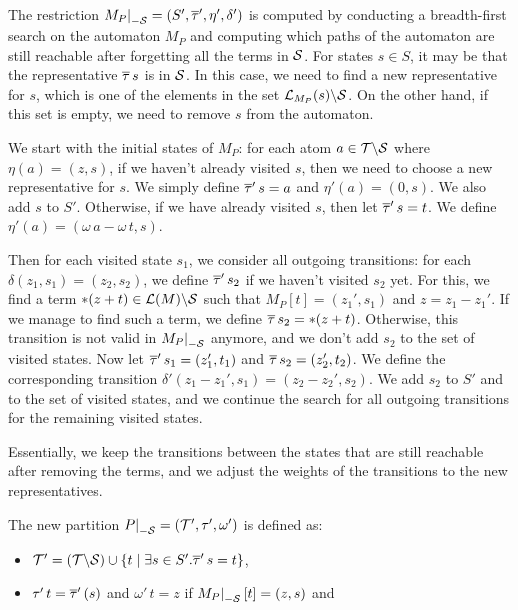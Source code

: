 The restriction $\restr{M_P}{-\Set} = (S', \otau', \eta', \delta')$ is computed by conducting a breadth-first search on the automaton $M_P$
and computing which paths of the automaton are still reachable after forgetting all the terms in $\mathcal{S}$.
For states $s \in S$, it may be that the representative $\overline{\tau}\,s$ is in $\mathcal{S}$.
In this case, we need to find a new representative for $s$, which is one of the elements in the set
$\mathcal{L}_{M_P}(s) \backslash \mathcal{S}$. On the other hand, if this set is empty,
we need to remove $s$ from the automaton.

We start with the initial states of $M_P$:
for each atom $a \in \mathcal{T} \backslash \mathcal{S}$ where $\eta(a) = (z, s)$, if we haven't already visited $s$, then we need to choose a new representative for $s$. We simply define $\overline{\tau}'\,s = a$ and $\eta'(a) = (0, s)$.
We also add $s$ to $S'$.
Otherwise, if we have already visited $s$, then let $\overline{\tau}'\,s = t$. We define $\eta'(a) = (\omega\,a - \omega\,t, s)$.

Then for each visited state $s_1$, we consider all outgoing transitions: for each $\delta(z_1, s_1) = (z_2, s_2)$,
we define $\overline{\tau}'\,s_2$ if we haven't visited $s_2$ yet.
For this, we find a term $*(z+t)\in \mathcal{L}(M)\backslash \mathcal{S}$ such that $M_P[t] = (z_1', s_1)$ and $z = z_1 - z_1'$.
If we manage to find such a term, we define $\overline{\tau}\,s_2 = *(z+t)$.
Otherwise, this transition is not valid in $\restr{M_P}{-\Set}$ anymore, and we don't add $s_2$ to the set of visited states.
Now let $\overline{\tau}'\,s_1 = (z_1', t_1)$ and $\overline{\tau}\,s_2 = (z_2', t_2)$.
We define the corresponding transition $\delta'(z_1 - z_1', s_1) = (z_2 - z_2', s_2)$.
We add $s_2$ to $S'$ and to the set of visited states, and we continue the search for all outgoing transitions for the remaining visited states.

Essentially, we keep the transitions between the states that are still reachable after removing the terms, and we adjust the weights of the transitions to the new representatives.

The new partition $\restr{P}{-\Set} = (\T', \tau', \omega')$ is defined as:
\begin{itemize}
    \item $\mathcal{T}' = (\mathcal{T} \backslash \mathcal{S}) \cup \{t \mid \exists s \in S' . \overline{\tau}'\,s = t\}$,
    \item $\tau'\,t = \overline{\tau}'\,(s)$ and $\omega'\,t = z$ if $\restr{M_P}{-\Set}[t] = (z,s)$ and
\end{itemize}


